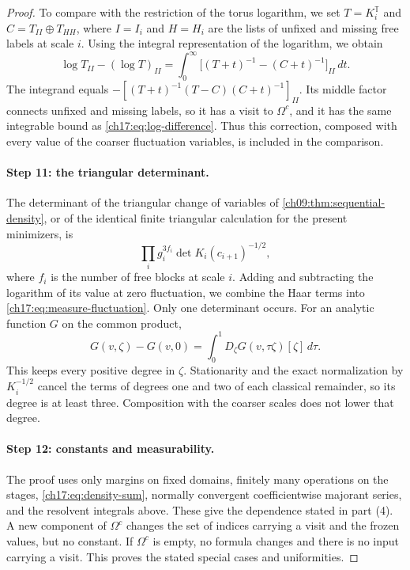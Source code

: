 \begin{proof}
To compare with the restriction of the torus logarithm, we set $T=K_i^{\mathbb T}$ and $C=T_{II}\oplus T_{HH}$, where $I=I_i$ and $H=H_i$ are the lists of unfixed and missing free labels at scale $i$. Using the integral representation of the logarithm, we obtain
\begin{equation}\label{ch17:eq:restricted-log}
 \log T_{II}-(\log T)_{II}=\int_0^\infty\bigl[(T+t)^{-1}-(C+t)^{-1}\bigr]_{II}\,dt.
\end{equation}
The integrand equals $-[(T+t)^{-1}(T-C)(C+t)^{-1}]_{II}$. Its middle factor connects unfixed and missing labels, so it has a visit to $\Omega^c$, and it has the same integrable bound as \eqref{ch17:eq:log-difference}. Thus this correction, composed with every value of the coarser fluctuation variables, is included in the comparison.

\paragraph{Step 11: the triangular determinant.}
The determinant of the triangular change of variables of \cref{ch09:thm:sequential-density}, or of the identical finite triangular calculation for the present minimizers, is
\[
 \prod_ig_i^{3f_i}\det K_i(c_{i+1})^{-1/2},
\]
where $f_i$ is the number of free blocks at scale $i$. Adding and subtracting the logarithm of its value at zero fluctuation, we combine the Haar terms into \eqref{ch17:eq:measure-fluctuation}. Only one determinant occurs. For an analytic function $G$ on the common product,
\begin{equation}\label{ch17:eq:free-difference}
 G(v,\zeta)-G(v,0)=\int_0^1D_\zeta G(v,\tau\zeta)[\zeta]\,d\tau.
\end{equation}
This keeps every positive degree in $\zeta$. Stationarity and the exact normalization by $K_i^{-1/2}$ cancel the terms of degrees one and two of each classical remainder, so its degree is at least three. Composition with the coarser scales does not lower that degree.

\paragraph{Step 12: constants and measurability.}
The proof uses only margins on fixed domains, finitely many operations on the stages, \eqref{ch17:eq:density-sum}, normally convergent coefficientwise majorant series, and the resolvent integrals above. These give the dependence stated in part (4). A new component of $\Omega^c$ changes the set of indices carrying a visit and the frozen values, but no constant. If $\Omega^c$ is empty, no formula changes and there is no input carrying a visit. This proves the stated special cases and uniformities.


\end{proof}
